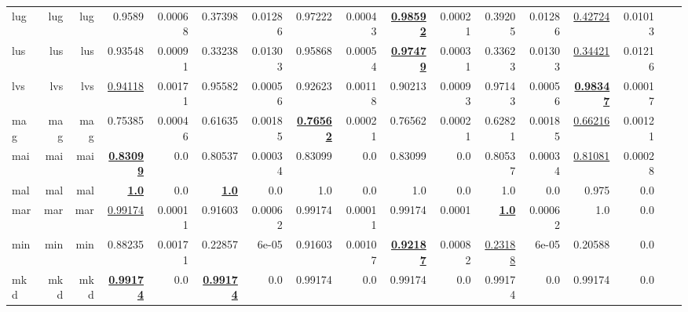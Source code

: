 \documentclass[11pt]{article}
\begin{document}
\begin{table*}[h]
{\begin{tabular}{lrrrrrrrrrrrrrrrr}
lug         & lug         & lug         & 0.9589         & 0.00068         & 0.37398         & 0.01286         & 0.97222         & 0.00043         & \textbf{\underline{0.98592}}         & 0.00021         & 0.39205         & 0.01286         & \underline{0.42724}         & 0.01013         \\
lus         & lus         & lus         & 0.93548         & 0.00091         & 0.33238         & 0.01303         & 0.95868         & 0.00054         & \textbf{\underline{0.97479}}         & 0.00031         & 0.33623         & 0.01303         & \underline{0.34421}         & 0.01216         \\
lvs         & lvs         & lvs         & \underline{0.94118}         & 0.00171         & 0.95582         & 0.00056         & 0.92623         & 0.00118         & 0.90213         & 0.00093         & 0.97143         & 0.00056         & \textbf{\underline{0.98347}}         & 0.00017         \\
mag         & mag         & mag         & 0.75385         & 0.00046         & 0.61635         & 0.00185         & \textbf{\underline{0.76562}}         & 0.00021         & 0.76562         & 0.00021         & 0.62821         & 0.00185         & \underline{0.66216}         & 0.00121         \\
mai         & mai         & mai         & \textbf{\underline{0.83099}}         & 0.0         & 0.80537         & 0.00034         & 0.83099         & 0.0         & 0.83099         & 0.0         & 0.80537         & 0.00034         & \underline{0.81081}         & 0.00028         \\
mal         & mal         & mal         & \textbf{\underline{1.0}}         & 0.0         & \textbf{\underline{1.0}}         & 0.0         & 1.0         & 0.0         & 1.0         & 0.0         & 1.0         & 0.0         & 0.975         & 0.0         \\
mar         & mar         & mar         & \underline{0.99174}         & 0.00011         & 0.91603         & 0.00062         & 0.99174         & 0.00011         & 0.99174         & 0.0001         & \textbf{\underline{1.0}}         & 0.00062         & 1.0         & 0.0         \\
min         & min         & min         & 0.88235         & 0.00171         & 0.22857         & 6e-05         & 0.91603         & 0.00107         & \textbf{\underline{0.92187}}         & 0.00082         & \underline{0.23188}         & 6e-05         & 0.20588         & 0.0         \\
mkd         & mkd         & mkd         & \textbf{\underline{0.99174}}         & 0.0         & \textbf{\underline{0.99174}}         & 0.0         & 0.99174         & 0.0         & 0.99174         & 0.0         & 0.99174         & 0.0         & 0.99174         & 0.0         \\

\end{tabular}}
\end{table*}
\end{document}
